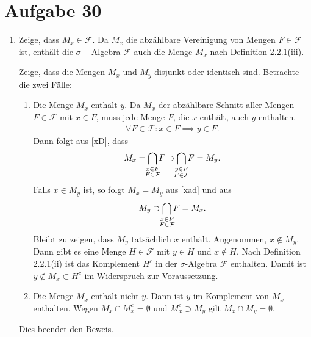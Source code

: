 \documentclass[a4paper,DIV=1]{article}
\theoremstyle{plain}
\begin{document}
	
\section*{Aufgabe 30}
\begin{enumerate}[label=(\roman*)]
	\item Zeige, dass $M_x \in \mathcal F$. Da $M_x$ die abzählbare Vereinigung von Mengen $F \in \mathcal F$ ist, enthält die $\sigma-$Algebra $\mathcal F$ auch die Menge $M_x$ nach Definition 2.2.1(iii).
	
	Zeige, dass die Mengen $M_x$ und $M_y$ disjunkt oder identisch sind. Betrachte die zwei Fälle:
	\begin{enumerate}
		\item Die Menge $M_x$ enthält $y$. Da $M_x$ der abzählbare Schnitt aller Mengen $F \in \mathcal F$ mit $x \in F$, muss jede Menge $F$, die $x$ enthält, auch $y$ enthalten.
		\begin{align}\label{xD}
			\forall F \in \mathcal F: x \in F \implies y \in F.
		\end{align}
		Dann folgt aus \eqref{xD}, dass 
		\begin{align}\label{xad}
			M_x = \bigcap_{\mathclap{\substack{x \in F\\ F \in \mathcal F}}}F \supset \bigcap_{\mathclap{\substack{y \in F\\ F \in \mathcal F}}}F = M_y.
		\end{align}
		Falls $x \in M_y$ ist, so folgt $M_x = M_y$ aus \eqref{xad} und aus
		\[
			M_y \supset \bigcap_{\mathclap{\substack{x \in F\\ F \in \mathcal F}}} F = M_x.
		\]
		Bleibt zu zeigen, dass $M_y$ tatsächlich $x$ enthält. Angenommen, $x \notin M_y$. Dann gibt es eine Menge $H \in \mathcal F$ mit $y \in H$ und $x \notin H$. Nach Definition 2.2.1(ii) ist das Komplement $H^c$ in der $\sigma$-Algebra $\mathcal F$ enthalten. Damit ist $y \notin M_x \subset H^c$ im Widerspruch zur Voraussetzung. 
		
		\item Die Menge $M_x$ enthält nicht $y$. Dann ist $y$ im Komplement von $M_x$ enthalten. Wegen $M_x \cap M_x^c = \emptyset$ und $M_x^c \supset M_y$ gilt $M_x \cap M_y = \emptyset$.
	\end{enumerate}
	Dies beendet den Beweis.


\end{enumerate}
\end{document}
